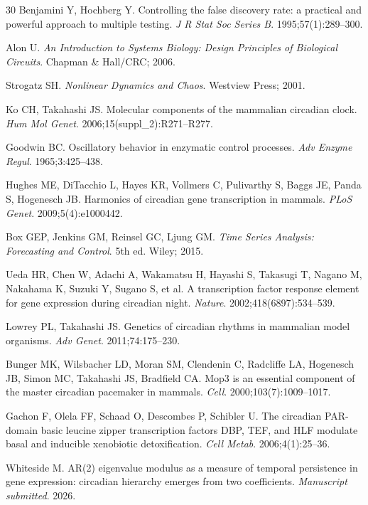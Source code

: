 \documentclass[11pt,letterpaper]{article}
\begin{document}
\begin{thebibliography}{30}
Benjamini Y, Hochberg Y.
Controlling the false discovery rate: a practical and powerful approach to multiple testing.
\textit{J R Stat Soc Series B}. 1995;57(1):289--300.

Alon U.
\textit{An Introduction to Systems Biology: Design Principles of Biological Circuits}.
Chapman \& Hall/CRC; 2006.

Strogatz SH.
\textit{Nonlinear Dynamics and Chaos}.
Westview Press; 2001.

Ko CH, Takahashi JS.
Molecular components of the mammalian circadian clock.
\textit{Hum Mol Genet}. 2006;15(suppl\_2):R271--R277.

Goodwin BC.
Oscillatory behavior in enzymatic control processes.
\textit{Adv Enzyme Regul}. 1965;3:425--438.

Hughes ME, DiTacchio L, Hayes KR, Vollmers C, Pulivarthy S, Baggs JE, Panda S, Hogenesch JB.
Harmonics of circadian gene transcription in mammals.
\textit{PLoS Genet}. 2009;5(4):e1000442.

Box GEP, Jenkins GM, Reinsel GC, Ljung GM.
\textit{Time Series Analysis: Forecasting and Control}.
5th ed. Wiley; 2015.

Ueda HR, Chen W, Adachi A, Wakamatsu H, Hayashi S, Takasugi T, Nagano M, Nakahama K, Suzuki Y, Sugano S, et al.
A transcription factor response element for gene expression during circadian night.
\textit{Nature}. 2002;418(6897):534--539.

Lowrey PL, Takahashi JS.
Genetics of circadian rhythms in mammalian model organisms.
\textit{Adv Genet}. 2011;74:175--230.

Bunger MK, Wilsbacher LD, Moran SM, Clendenin C, Radcliffe LA, Hogenesch JB, Simon MC, Takahashi JS, Bradfield CA.
Mop3 is an essential component of the master circadian pacemaker in mammals.
\textit{Cell}. 2000;103(7):1009--1017.

Gachon F, Olela FF, Schaad O, Descombes P, Schibler U.
The circadian PAR-domain basic leucine zipper transcription factors DBP, TEF, and HLF modulate basal and inducible xenobiotic detoxification.
\textit{Cell Metab}. 2006;4(1):25--36.

Whiteside M.
AR(2) eigenvalue modulus as a measure of temporal persistence in gene expression: circadian hierarchy emerges from two coefficients.
\textit{Manuscript submitted}. 2026.


\end{thebibliography}
\end{document}
